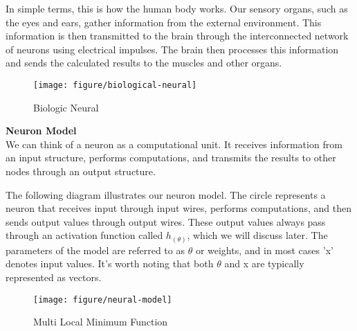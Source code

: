 \documentclass{article}
\begin{document}
    In simple terms, this is how the human body works. Our sensory organs, such as the eyes and ears, gather information from the external environment. This information is then transmitted to the brain through the interconnected network of neurons using electrical impulses. The brain then processes this information and sends the calculated results to the muscles and other organs. \\
    
    \begin{figure}[htbp]
        \centering
        \texttt{[image: figure/biological-neural]}
        \caption{Biologic Neural}
     \end{figure}
    
    
    \noindent
    \textbf{Neuron Model}\\
    We can think of a neuron as a computational unit. It receives information from an input structure, performs computations, and transmits the results to other nodes through an output structure.

    The following diagram illustrates our neuron model. The circle represents a neuron that receives input through input wires, performs computations, and then sends output values through output wires. These output values always pass through an activation function called $h_(\theta)$, which we will discuss later. The parameters of the model are referred to as $\theta$ or weights, and in most cases 'x' denotes input values. It's worth noting that both $\theta$ and x are typically represented as vectors.


    \begin{figure}[htbp]
        \centering
        \texttt{[image: figure/neural-model]}
        \caption{Multi Local Minimum Function}
     \end{figure}
\end{document}
